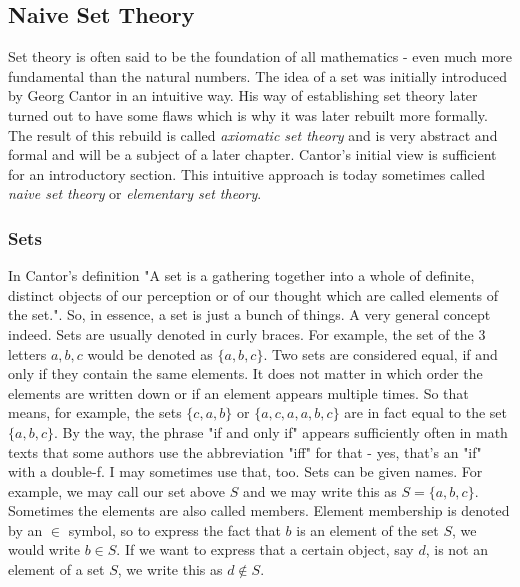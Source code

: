 

\subsection{Naive Set Theory}
\label{Sec:NaiveSetTheory}
Set theory is often said to be the foundation of all mathematics - even much more fundamental than the natural numbers. The idea of a set was initially introduced by Georg Cantor in an intuitive way. His way of establishing set theory later turned out to have some flaws which is why it was later rebuilt more formally. The result of this rebuild is called \emph{axiomatic set theory} and is very abstract and formal and will be a subject of a later chapter.  Cantor's initial view is sufficient for an introductory section. This intuitive approach is today sometimes called \emph{naive set theory} or \emph{elementary set theory}.



\subsubsection{Sets}
In Cantor's definition "A set is a gathering together into a whole of definite, distinct objects of our perception or of our thought which are called elements of the set.". So, in essence, a set is just a bunch of things. A very general concept indeed. Sets are usually denoted in curly braces. For example, the set of the 3 letters $a,b,c$ would be denoted as $\{a,b,c\}$. Two sets are considered equal, if and only if they contain the same elements. It does not matter in which order the elements are written down or if an element appears multiple times. So that means, for example, the sets $\{c,a,b\}$ or $\{a,c,a,a,b,c\}$ are in fact equal to the set $\{a,b,c\}$. By the way, the phrase "if and only if" appears sufficiently often in math texts that some authors use the abbreviation "iff" for that - yes, that's an "if" with a double-f. I may sometimes use that, too. Sets can be given names. For example, we may call our set above $S$ and we may write this as $S = \{a,b,c\}$. Sometimes the elements are also called members. Element membership is denoted by an $\in$ symbol, so to express the fact that $b$ is an element of the set $S$, we would write $b \in S$. If we want to express that a certain object, say $d$, is not an element of a set $S$, we write this as $d \notin S$.

